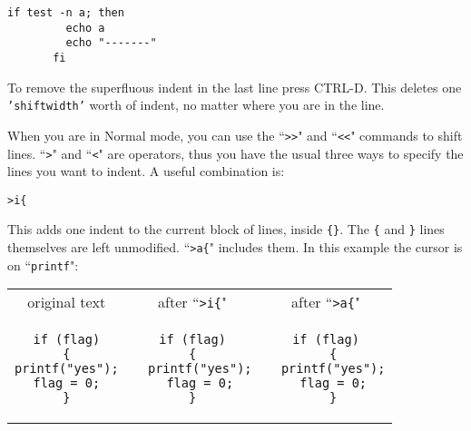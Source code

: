 \begin{Verbatim}[samepage=true]
    if test -n a; then
         echo a
         echo "-------"
       fi
\end{Verbatim}

To remove the superfluous indent in the last line press CTRL-D.
This deletes one \texttt{'shiftwidth'} worth of indent, no matter where you are in the line.

When you are in Normal mode, you can use the ``\texttt{>>}" and ``\texttt{<<}" commands to shift lines.
``\texttt{>}" and ``\texttt{<}" are operators, thus you have the usual three ways to specify the lines you want to indent.
A useful combination is:

\begin{Verbatim}[samepage=true]
 >i{
\end{Verbatim}

This adds one indent to the current block of lines, inside \texttt{\{\}}.
The \texttt{\{} and \texttt{\}} lines themselves are left unmodified.
``\texttt{>a\{}" includes them.
In this example the cursor is on ``\texttt{printf}":

\begin{center} \begin{tabular}{|c|c|c|}
				\hline
				original text & after ``\texttt{>i\{}" & after ``\texttt{>a\{}" \\
				\begin{minipage}{4cm}
				\begin{verbatim}
if (flag)
{
printf("yes");
flag = 0;
}
				\end{verbatim}
				\end{minipage}
&
				\begin{minipage}{4cm}
				\begin{verbatim}
if (flag)
{
  printf("yes");
  flag = 0;
}
				\end{verbatim}
				\end{minipage}
&
				\begin{minipage}{4cm}
				\begin{verbatim}
if (flag)
  {
  printf("yes");
  flag = 0;
  }
				\end{verbatim}
				\end{minipage} \\
				\hline
\end{tabular} \end{center}
